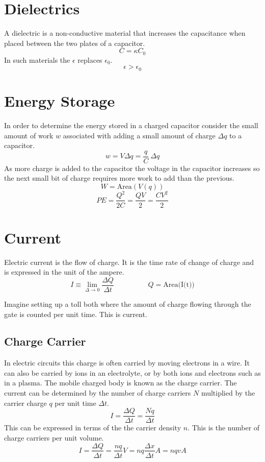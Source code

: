  
 \section{Dielectrics}
 A dielectric is a non-conductive material that increases the capacitance when placed between the two plates of a capacitor.
 $$C=\kappa C_0$$
 In such materials the $\epsilon$ replaces $\epsilon_0$.  
 $$\epsilon>\epsilon_0$$
 

\section{Energy Storage}
In order to determine the energy stored in a charged capacitor consider the small amount of work $w$ associated with adding a small amount of charge $\Delta q$ to a capacitor.
$$w=V \Delta q= \frac{q}{C}\  \Delta q$$
As more charge is added to the capacitor the voltage in the capacitor increases so the next small bit of charge requires more work to add than the previous.
$$W=\text{Area}(V(q))$$
$$PE=\frac{Q^2}{2C}=\frac{QV}{2}=\frac{CV^2}{2}$$

 \newpage
 
\section{Current}
Electric current is the flow of charge.  It is the time rate of change of charge and is expressed in the unit of the ampere.
$$I \equiv \lim_{\Delta \rightarrow 0}\frac{\Delta Q}{\Delta t} \hspace{2cm} Q=\text{Area(I(t))}$$


Imagine setting up a toll both where the amount of charge flowing through the gate is counted per unit time.  This is current.
\subsection{Charge Carrier}
In electric circuits this charge is often carried by moving electrons in a wire. It can also be carried by ions in an electrolyte, or by both ions and electrons such as in a plasma.  The mobile charged body is known as the charge carrier.  The current can be determined by the number of charge carriers $N$ multiplied by the carrier charge $q$ per unit time $\Delta t$.
$$I=\frac{\Delta Q}{\Delta t}=\frac{N q}{\Delta t}$$
This can be expressed in terms of the the carrier density $n$.  This is the number of charge carriers per unit volume.
$$I=\frac{\Delta Q}{\Delta t}=\frac{n q}{\Delta t}V=nq\frac{\Delta x}{\Delta t}A=nqvA$$


